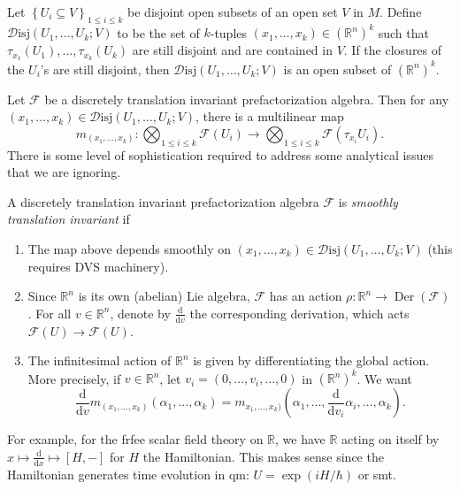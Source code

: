 
Let $\left\{ U_i \subseteq V\right\} _{1\leq i\leq k} $ be disjoint open subsets of an open set $V$ in $M$. Define $\mathcal{D} \mathrm{isj} (U_1, \ldots ,U_k ; V)$ to be the set of $k$-tuples $(x_1, \ldots ,x_k)\in(\mathbb{R}^n)^k $ such that $\tau _{x_1} (U_1), \ldots ,\tau _{x_k} (U_k)$ are still disjoint and are contained in $V$. If the closures of the $U_i$'s are still disjoint, then $\mathcal{D} \mathrm{isj} (U_1, \ldots ,U_k;V)$ is an open subset of $(\mathbb{R} ^n)^k$.

Let $\mathcal{F} $ be a discretely translation invariant prefactorization algebra. Then for any $(x_1, \ldots ,x_k)\in \mathcal{D} \mathrm{isj} (U_1, \ldots ,U_k;V)$, there is a multilinear map
\[
	m_{(x_1, \ldots ,x_k)} : \bigotimes_{1\leq i\leq k} \mathcal{F} (U_i) \to \bigotimes_{1\leq i\leq k} \mathcal{F} (\tau _{x_i} U_i)
.\]
There is some level of sophistication required to address some analytical issues that we are ignoring.

\begin{definition}\label{dfn:7.1.9}
	A discretely translation invariant prefactorization algebra $\mathcal{F} $ is \emph{smoothly translation invariant} if
	\begin{enumerate}
		\item The map above depends smoothly on $(x_1, \ldots ,x_k)\in \mathcal{D} \mathrm{isj} (U_1, \ldots ,U_k;V)$ (this requires DVS machinery).
		\item Since $\mathbb{R} ^n$ is its own (abelian) Lie algebra, $\mathcal{F} $ has an action $\rho : \mathbb{R} ^n \to \operatorname{Der} (\mathcal{F} )$. For all $v\in\mathbb{R} ^n$, denote by $\frac{\mathrm{d}}{\mathrm{d}v} $ the corresponding derivation, which acts $\mathcal{F} (U)\to \mathcal{F} (U)$.
		\item The infinitesimal action of $\mathbb{R} ^n$ is given by differentiating the global action. More precisely, if $v\in\mathbb{R} ^n$, let $v_i = (0, \ldots ,v_i, \ldots ,0)$ in $(\mathbb{R} ^n)^k$. We want
			\[
				\frac{\mathrm{d}}{\mathrm{d}v} m_{(x_1, \ldots ,x_k)} (\alpha _1, \ldots ,\alpha _k) = m_{x_1, \ldots ,x_k)} \left( \alpha _1, \ldots , \frac{\mathrm{d}}{\mathrm{d}v_i} \alpha _i, \ldots ,\alpha _k \right) 
			.\]
	\end{enumerate}
\end{definition}

For example, for the frfee scalar field theory on $\mathbb{R} $, we have $\mathbb{R} $ acting on itself by $x\mapsto \frac{\mathrm{d}}{\mathrm{d}x} \mapsto [H,-]$ for $H$ the Hamiltonian. This makes sense since the Hamiltonian generates time evolution in qm: $U = \exp (iH / \hbar )$ or smt.

